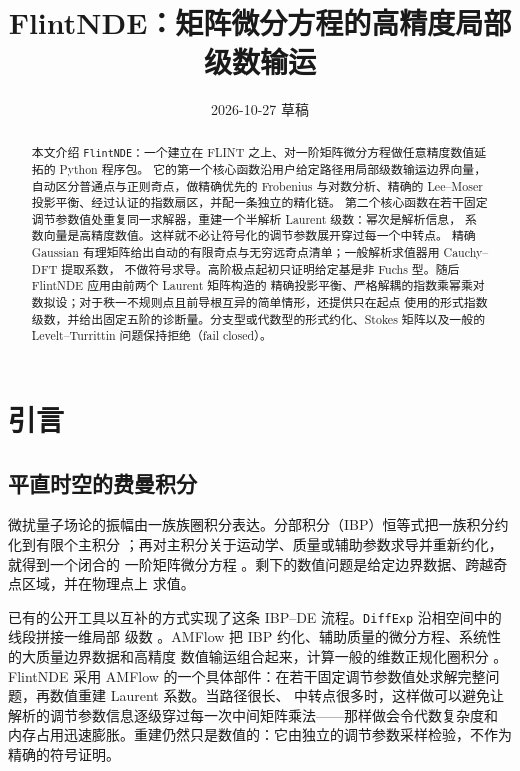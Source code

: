 \documentclass[11pt,a4paper]{ctexart}
\title{FlintNDE：矩阵微分方程的高精度局部级数输运}
\date{2026-10-27 草稿}
\renewcommand{\_}{\origunderscore\allowbreak}
\begin{document}
\maketitle

\begin{abstract}
本文介绍 \texttt{FlintNDE}：一个建立在 FLINT 之上、对一阶矩阵微分方程做任意精度数值延拓的 Python 程序包。
它的第一个核心函数沿用户给定路径用局部级数输运边界向量，自动区分普通点与正则奇点，做精确优先的
Frobenius 与对数分析、精确的 Lee--Moser 投影平衡、经过认证的指数扇区，并配一条独立的精化链。
第二个核心函数在若干固定调节参数值处重复同一求解器，重建一个半解析 Laurent 级数：幂次是解析信息，
系数向量是高精度数值。这样就不必让符号化的调节参数展开穿过每一个中转点。
精确 Gaussian 有理矩阵给出自动的有限奇点与无穷远奇点清单；一般解析求值器用 Cauchy--DFT 提取系数，
不做符号求导。高阶极点起初只证明给定基是非 Fuchs 型。随后 FlintNDE 应用由前两个 Laurent 矩阵构造的
精确投影平衡、严格解耦的指数乘幂乘对数拟设；对于秩一不规则点且前导根互异的简单情形，还提供只在起点
使用的形式指数级数，并给出固定五阶的诊断量。分支型或代数型的形式约化、Stokes 矩阵以及一般的
Levelt--Turrittin 问题保持拒绝（fail closed）。
\end{abstract}

\section{引言}

\subsection{平直时空的费曼积分}

微扰量子场论的振幅由一族族圈积分表达。分部积分（IBP）恒等式把一族积分约化到有限个主积分
\cite{Chetyrkin:1981qh}；再对主积分关于运动学、质量或辅助参数求导并重新约化，就得到一个闭合的
一阶矩阵微分方程 \cite{Gehrmann:1999as}。剩下的数值问题是给定边界数据、跨越奇点区域，并在物理点上
求值。

已有的公开工具以互补的方式实现了这条 IBP--DE 流程。\texttt{DiffExp} 沿相空间中的线段拼接一维局部
级数 \cite{Hidding:2020ytt}。AMFlow 把 IBP 约化、辅助质量的微分方程、系统性的大质量边界数据和高精度
数值输运组合起来，计算一般的维数正规化圈积分 \cite{Liu:2022chg,Huang:2026rjb}。FlintNDE 采用
AMFlow 的一个具体部件：在若干固定调节参数值处求解完整问题，再数值重建 Laurent 系数。当路径很长、
中转点很多时，这样做可以避免让解析的调节参数信息逐级穿过每一次中间矩阵乘法——那样做会令代数复杂度和
内存占用迅速膨胀。重建仍然只是数值的：它由独立的调节参数采样检验，不作为精确的符号证明。
\end{document}
